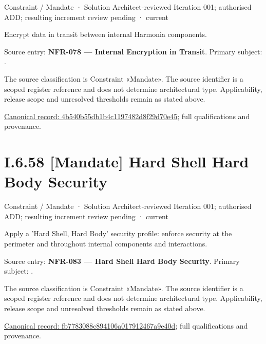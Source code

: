 \label{element:4b540b55db1b4c1197482d8f29d70e45}
{\small Constraint / Mandate · Solution Architect-reviewed Iteration 001; authorised ADD; resulting increment review pending · current}\par

Encrypt data in transit between internal Harmonia components.



Source entry: \textbf{NFR-078 — Internal Encryption in Transit}. Primary subject: \texttt{}.



The source classification is Constraint «Mandate». The source identifier is a scoped register reference and does not determine architectural type. Applicability, release scope and unresolved thresholds remain as stated above.


{\footnotesize \href{../../../../../../../continuum/motivation/constraint/mandate/4b540b55db1b4c1197482d8f29d70e45.md}{Canonical record: 4b540b55db1b4c1197482d8f29d70e45}; full qualifications and provenance.}\par
\section*{I.6.58 [Mandate] Hard Shell Hard Body Security}
\label{navigation:I.6.58}

\label{element:fb7783088c894106a017912467a9e40d}
{\small Constraint / Mandate · Solution Architect-reviewed Iteration 001; authorised ADD; resulting increment review pending · current}\par

Apply a 'Hard Shell, Hard Body' security profile: enforce security at the perimeter and throughout internal components and interactions.



Source entry: \textbf{NFR-083 — Hard Shell Hard Body Security}. Primary subject: \texttt{}.



The source classification is Constraint «Mandate». The source identifier is a scoped register reference and does not determine architectural type. Applicability, release scope and unresolved thresholds remain as stated above.


{\footnotesize \href{../../../../../../../continuum/motivation/constraint/mandate/fb7783088c894106a017912467a9e40d.md}{Canonical record: fb7783088c894106a017912467a9e40d}; full qualifications and provenance.}\par
